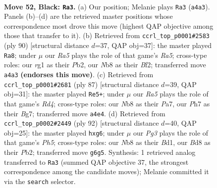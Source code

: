 \documentclass[11pt]{article}
\begin{document}
\clearpage

\begin{figure}[p]\centering
\begin{subfigure}{0.46\textwidth}\centering
\resizebox{\linewidth}{!}{%
\newchessgame
\chessboard[
  setfen={1nkb4/1p5p/6pP/p4p2/r4N2/6P1/3R3K/6R1 b - - 1 52},
  showmover=false,
  pgfstyle=straightmove, color=movearrow, markmove={a4-a3}
]}
\caption{}
\end{subfigure}\hfill
\begin{subfigure}{0.46\textwidth}\centering
\resizebox{\linewidth}{!}{%
\newchessgame
\chessboard[
  setfen={8/1p4r1/4k3/R2nPp2/P2PpP2/8/1P3B2/5K2 w - - 0 46},
  showmover=false,
  pgfstyle=straightmove, color=movearrow, markmove={a5-a8}
]}
\caption{}
\end{subfigure}
\\[4pt]
\begin{subfigure}{0.46\textwidth}\centering
\resizebox{\linewidth}{!}{%
\newchessgame
\chessboard[
  setfen={8/p5bk/6p1/3r3p/8/2p3P1/P1R1KP1P/3N4 b - - 9 44},
  showmover=false,
  pgfstyle=straightmove, color=movearrow, markmove={d5-e5}
]}
\caption{}
\end{subfigure}\hfill
\begin{subfigure}{0.46\textwidth}\centering
\resizebox{\linewidth}{!}{%
\newchessgame
\chessboard[
  setfen={1r4k1/5p2/R3n1p1/2pp3P/6P1/P7/KP6/3B4 w - - 2 47},
  showmover=false,
  pgfstyle=straightmove, color=movearrow, markmove={h5-g6}
]}
\caption{}
\end{subfigure}
\caption{\textbf{Move 52, Black: \texttt{Ra3}.} (a) Our position; Melanie plays \texttt{Ra3} (\texttt{a4a3}). Panels (b)--(d) are the retrieved master positions whose correspondence most drove this move (highest QAP objective among those that transfer to it). (b) Retrieved from \texttt{ccrl\_top\_p0001\#2583} (ply 90) [structural distance $d$=37, QAP obj=37]: the master played \texttt{Ra8}; under $\mu$ our \emph{Ra5} plays the role of that game's \emph{Ra5}; cross-type roles: our \emph{r}g1 as their \emph{P}b2, our \emph{N}b8 as their \emph{B}f2; transferred move \texttt{a4a3} \textbf{(endorses this move)}. (c) Retrieved from \texttt{ccrl\_top\_p0001\#2681} (ply 87) [structural distance $d$=39, QAP obj=31]: the master played \texttt{Re5+}; under $\mu$ our \emph{Ra5} plays the role of that game's \emph{Rd4}; cross-type roles: our \emph{N}b8 as their \emph{P}a7, our \emph{P}h7 as their \emph{B}g7; transferred move \texttt{a4e4}. (d) Retrieved from \texttt{ccrl\_top\_p0002\#2449} (ply 92) [structural distance $d$=40, QAP obj=25]: the master played \texttt{hxg6}; under $\mu$ our \emph{Pg3} plays the role of that game's \emph{Ph5}; cross-type roles: our \emph{N}b8 as their \emph{B}d1, our \emph{B}d8 as their \emph{P}b2; transferred move \texttt{g6g5}. Synthesis: 1 retrieved analog transferred to \texttt{Ra3} (summed QAP objective 37, the strongest correspondence among the candidate moves); Melanie committed it via the \texttt{search} selector.}
\label{fig:thought-m103}
\end{figure}
\end{document}
